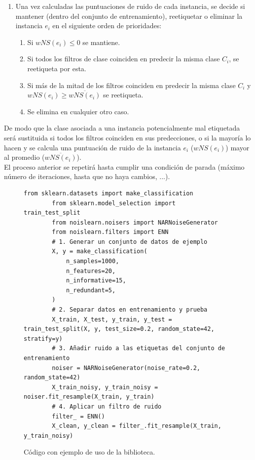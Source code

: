 \documentclass[print, color]{ugrTFG}
\begin{document}
\begin{itemize}
\begin{enumerate}
            \item Una vez calculadas las puntuaciones de ruido de cada instancia, se decide si mantener (dentro del conjunto de entrenamiento), reetiquetar o eliminar la instancia $e_i$ en el siguiente orden de prioridades:
            \begin{enumerate}
                \item Si  $wNS(e_i)\leq0$ se mantiene.
                \item Si todos los filtros de clase coinciden en predecir la misma clase $C_i$, se reetiqueta por esta.
                \item Si más de la mitad de los filtros coinciden en predecir la misma clase $C_i$ y $wNS(e_i)\geq\overline{wNS(e_i)}$ se reetiqueta.
                \item Se elimina en cualquier otro caso.
            \end{enumerate}
        \end{enumerate}
        De modo que la clase asociada a una instancia potencialmente mal etiquetada será sustituida si todos los filtros coinciden en sus predecciones, o si la mayoría lo hacen y se calcula una puntuación de ruido de la instancia $e_i$ ($wNS(e_i)$) mayor al promedio ($\overline{wNS(e_i)}$).\\

        El proceso anterior se repetirá hasta cumplir una condición de parada (máximo número de iteraciones, hasta que no haya cambios, ...).
 \end{itemize}

 
    \begin{figure}[htbp]
        \centering
        \begin{lstlisting}[style=mystyle, caption={Ejemplo básico de uso de \texttt{noislearn}}]
        from sklearn.datasets import make_classification
        from sklearn.model_selection import train_test_split
        from noislearn.noisers import NARNoiseGenerator
        from noislearn.filters import ENN
        # 1. Generar un conjunto de datos de ejemplo
        X, y = make_classification(
            n_samples=1000,
            n_features=20,
            n_informative=15,
            n_redundant=5,
        )
        # 2. Separar datos en entrenamiento y prueba
        X_train, X_test, y_train, y_test = train_test_split(X, y, test_size=0.2, random_state=42, stratify=y)
        # 3. Añadir ruido a las etiquetas del conjunto de entrenamiento
        noiser = NARNoiseGenerator(noise_rate=0.2, random_state=42)
        X_train_noisy, y_train_noisy = noiser.fit_resample(X_train, y_train)
        # 4. Aplicar un filtro de ruido
        filter_ = ENN()
        X_clean, y_clean = filter_.fit_resample(X_train, y_train_noisy)
        \end{lstlisting}
        \caption{Código con ejemplo de uso de la biblioteca.}
        \label{fig:casoDeUso}
    \end{figure}
\end{document}
